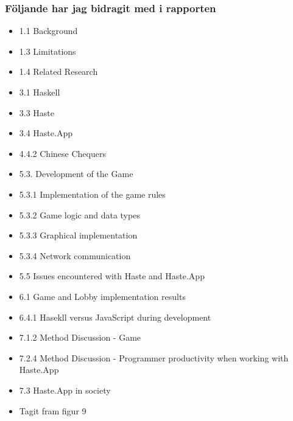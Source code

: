 \subsubsection{Följande har jag bidragit med i rapporten}
\begin{itemize}
    \item 1.1 Background
    \item 1.3 Limitations
    \item 1.4 Related Research
    \item 3.1 Haskell
    \item 3.3 Haste
    \item 3.4 Haste.App
    \item 4.4.2 Chinese Chequers
    \item 5.3. Development of the Game
    \item 5.3.1 Implementation of the game rules
    \item 5.3.2 Game logic and data types
    \item 5.3.3 Graphical implementation
    \item 5.3.4 Network communication
    \item 5.5 Issues encountered with Haste and Haste.App
    \item 6.1 Game and Lobby implementation results
    \item 6.4.1 Hasekll versus JavaScript during development
    \item 7.1.2 Method Discussion - Game
    \item 7.2.4 Method Discussion - Programmer productivity when working with Haste.App
    \item 7.3 Haste.App in society
    \item Tagit fram figur 9
\end{itemize}